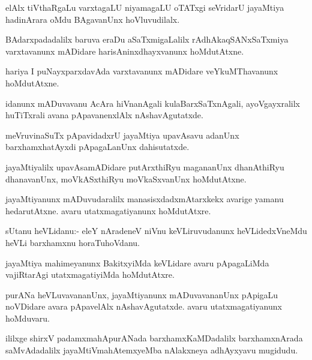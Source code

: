 \begin{mng}
elAlx tiVthaRgaLu varxtagaLU niyamagaLU oTATxgi seVridarU jayaMtiya hadinArara oMdu BAgavanUnx hoVluvudilalx.
\end{mng}

\begin{mng}
BAdarxpadadalilx baruva eraDu aSaTxmigaLalilx rAdhAkaqSANxSaTxmiya varxtavanunx mADidare harisAninxdhayxvanunx hoMdutAtxne.
\end{mng}

\begin{mng}
hariya I puNayxparxdavAda varxtavanunx mADidare veYkuMThavanunx hoMdutAtxne.
\end{mng}

\begin{mng}
idanunx mADuvavanu AcAra hiVnanAgali kulaBarxSaTxnAgali, ayoVgayxralilx huTiTxrali avana pApavanenxlAlx nAshavAgutatxde.
\end{mng}

\begin{mng}
meVruvinaSuTx pApavidadxrU jayaMtiya upavAsavu adanUnx barxhamxhatAyxdi pApagaLanUnx dahisutatxde.
\end{mng}

\begin{mng}
jayaMtiyalilx upavAsamADidare putArxthiRyu magananUnx dhanAthiRyu dhanavanUnx, moVkASxthiRyu moVkaSxvanUnx hoMdutAtxne.
\end{mng}

\begin{mng}
jayaMtiyanunx mADuvudaralilx manasisxdadxmAtarxkekx avarige yamanu hedarutAtxne. avaru utatxmagatiyanunx hoMdutAtxre.
\end{mng}

\begin{mng}
sUtanu heVLidanu:- eleY nAradeneV niVnu keVLiruvudanunx heVLidedxVneMdu heVLi barxhamxnu horaTuhoVdanu.
\end{mng}

\begin{mng}
jayaMtiya mahimeyanunx BakitxyiMda keVLidare avaru pApagaLiMda vajiRtarAgi utatxmagatiyiMda hoMdutAtxre.
\end{mng}

\begin{mng}
purANa heVLuvavananUnx, jayaMtiyanunx mADuvavananUnx pApigaLu noVDidare avara pApavelAlx nAshavAgutatxde. avaru utatxmagatiyanunx hoMduvaru.
\end{mng}
ililxge shirxV padamxmahApurANada barxhamxKaMDadalilx barxhamxnArada saMvAdadalilx jayaMtiVmahAtemxyeMba nAlakxneya adhAyxyavu mugidudu.

